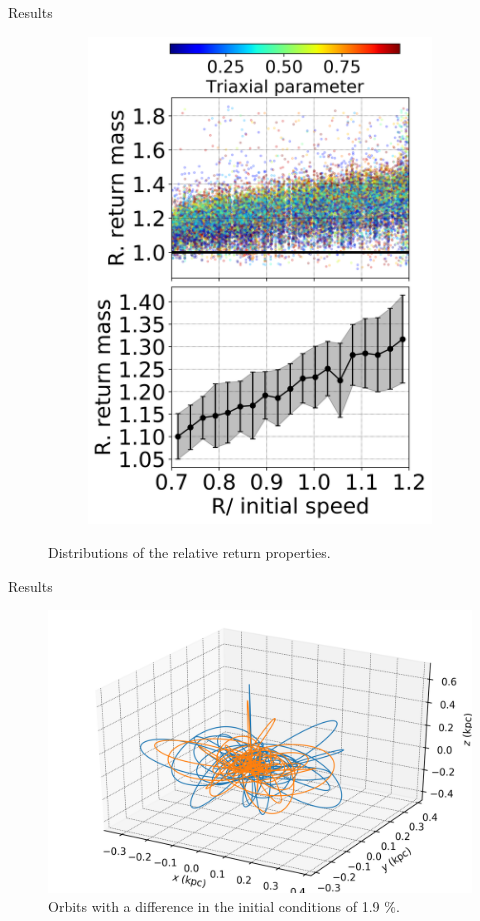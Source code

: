 \documentclass[handout]{beamer}
\begin{document}
\begin{frame}{Results}
\begin{figure}[h]
\begin{subfigure}[b]{0.35\linewidth}
			\includegraphics[width = \linewidth]{"../Files/Week 14/relative_mass_slides"}
		\end{subfigure}
		\caption{Distributions of the relative return properties.}
		\label{fig: relatives}
	\end{figure}
\end{frame}

\begin{frame}{Results}
	\begin{figure}[h]
		\centering
		\includegraphics[width = 0.7\linewidth]{"../Files/Week 14/lyapunov_orbits"}
		\caption{Orbits with a difference in the initial conditions of 1.9 \%.}
		\label{fig: lyapunov17}
	\end{figure}
\end{frame}
\end{document}
